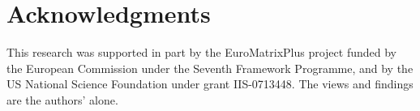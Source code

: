 \documentclass[logo]{pbml}
\begin{document}


\section*{Acknowledgments}
This research was supported in part by the EuroMatrixPlus project funded by
the European Commission under the Seventh Framework Programme, and by the US National Science Foundation under grant IIS-0713448.  The views and findings are the authors' alone. 


\end{document}
